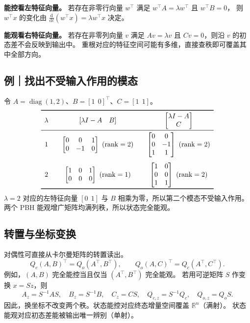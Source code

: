 \documentclass[UTF8,a4paper,12pt,fontset=fandol]{ctexart}
\DeclareMathOperator{\rank}{rank}
\begin{document}
\begin{keybox}
\textbf{能控看左特征向量。}
若存在非零行向量 $w^\top$ 满足 $w^\top A=\lambda w^\top$ 且 $w^\top B=0$，
则 $w^\top x$ 的变化由 $\tfrac{\mathrm d}{\mathrm dt}(w^\top x)=\lambda w^\top x$ 决定。

\textbf{能观看右特征向量。}
若存在非零列向量 $v$ 满足 $Av=\lambda v$ 且 $Cv=0$，则沿 $v$ 的初态差不会反映到输出中。
重根对应的特征空间可能有多维，直接查秩即可覆盖其中全部方向。
\end{keybox}

\subsection*{例｜找出不受输入作用的模态}
令 $A=\operatorname{diag}(1,2)$、$B=[1\ \ 0]^\top$、$C=[1\ \ 1]$。
\[
\begin{array}{c@{\qquad}c@{\qquad}c}
\toprule
\lambda & [\lambda I-A\quad B] & \begin{bmatrix}\lambda I-A\\C\end{bmatrix}\\[2pt]
\midrule
1 & \begin{bmatrix}0&0&1\\0&-1&0\end{bmatrix}\ (\rank=2)
  & \begin{bmatrix}0&0\\0&-1\\1&1\end{bmatrix}\ (\rank=2)\\
\addlinespace[8pt]
2 & \begin{bmatrix}1&0&1\\0&0&0\end{bmatrix}\ (\rank=1)
  & \begin{bmatrix}1&0\\0&0\\1&1\end{bmatrix}\ (\rank=2)\\[4pt]
\bottomrule
\end{array}
\]
$\lambda=2$ 对应的左特征向量 $[0\ \ 1]$ 与 $B$ 相乘为零，所以第二个模态不受输入作用。
两个 PBH 能观增广矩阵均满列秩，所以状态完全能观。

\subsection*{转置与坐标变换}
对偶性可直接从卡尔曼矩阵的转置读出。
\[
 Q_c(A,B)^\top=Q_o(A^\top,B^\top),
 \qquad Q_o(A,C)^\top=Q_c(A^\top,C^\top).
\]
例如，$(A,B)$ 完全能控当且仅当 $(A^\top,B^\top)$ 完全能观。
若用可逆矩阵 $S$ 作变换 $x=Sz$，则
\[
  A_z=S^{-1}AS,\quad B_z=S^{-1}B,\quad C_z=CS,\quad
  Q_{c,z}=S^{-1}Q_c,\quad Q_{o,z}=Q_oS .
\]
因此，换坐标不改变两个秩。状态能控对应终态增量空间覆盖 $\mathbb R^n$（满射）。
状态能观对应初态差能被输出唯一辨别（单射）。
\end{document}
